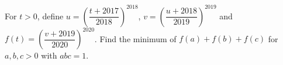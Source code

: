 For $t>0$, define $u=\left(\dfrac{t+2017}{2018}\right)^{2018}$, $v=\left(\dfrac{u+2018}{2019}\right)^{2019}$ and $f(t)=\left(\dfrac{v+2019}{2020}\right)^{2020}$. Find the minimum of $f(a)+f(b)+f(c)$ for $a,b,c>0$ with $abc=1$.
